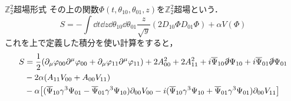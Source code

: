 \documentclass[dvipdfmx]{beamer}
\newcommand{\Ztt}{\mathbb{Z}_2^2}
\begin{document}
\begin{frame}
\begin{columns}[t]
\begin{column}{0.47\textwidth}
\begin{block}{$\Ztt$超場形式}
		その上の関数$\Phi(t, \theta_{10}, \theta_{01}, z)$を$\Ztt$超場という．
			\[S = -\int\dd{t}\dd{z}\dd{\theta_{10}}\dd{\theta_{01}}\frac{z}{\sqrt{y}}(2D_{10}\Phi D_{01}\Phi) + \alpha V(\Phi)\]
			これを上で定義した積分を使い計算をすると，
			\small{
			\begin{align*}
				S &= \frac{1}{2} (\partial_{\mu} \varphi_{00} \partial^{\mu} \varphi_{00} + \partial_{\mu} \varphi_{11} \partial^{\mu} \varphi_{11}) +2 A_{00}^2 + 2 A_{11}^2
	+i \overline{\Psi}_{10}  \slashed{\partial} \Psi_{10} 
	+i \overline{\Psi}_{01}  \slashed{\partial} \Psi_{01}
	\nonumber \\
	&-2\alpha ( A_{11} V_{00} + A_{00} V_{11} )
	\nonumber \\
	& - \alpha \big[ (\overline{\Psi}_{10} \gamma^3 \Psi_{01} - \overline{\Psi}_{01}\gamma^3 \Psi_{10}) \partial_{00} V_{00}
	-i( \overline{\Psi}_{10} \gamma^3 \Psi_{10} + \overline{\Psi}_{01} \gamma^3 \Psi_{01}) \partial_{00} V_{11} \big]
\end{align*}}
		\end{block}
		\end{column}
\end{columns}
\end{frame}
\end{document}
